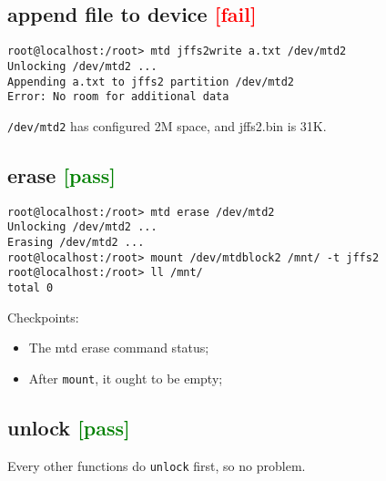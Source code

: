 \documentclass[a4paper]{report}
\begin{document}
\subsection{append file to device \textcolor{red}{[fail]}}
\begin{lstlisting}
root@localhost:/root> mtd jffs2write a.txt /dev/mtd2
Unlocking /dev/mtd2 ...
Appending a.txt to jffs2 partition /dev/mtd2
Error: No room for additional data
\end{lstlisting}
{\tt /dev/mtd2} has configured 2M space, and jffs2.bin is 31K.
\subsection{erase \textcolor{green}{[pass]}}
\begin{lstlisting}
root@localhost:/root> mtd erase /dev/mtd2
Unlocking /dev/mtd2 ...
Erasing /dev/mtd2 ...
root@localhost:/root> mount /dev/mtdblock2 /mnt/ -t jffs2
root@localhost:/root> ll /mnt/
total 0
\end{lstlisting}
Checkpoints:
\begin{itemize}
    \item The {mtd erase} command status;
    \item After {\tt mount}, it ought to be empty;
\end{itemize}
\subsection{unlock \textcolor{green}{[pass]}}
Every other functions do {\tt unlock} first, so no problem.
\end{document}
